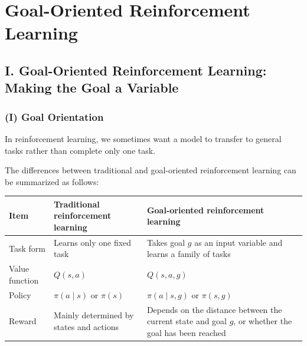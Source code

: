 \setcounter{section}{4}

\hypertarget{goal-oriented-reinforcement-learning}{%
\section{Goal-Oriented Reinforcement Learning}\label{goal-oriented-reinforcement-learning}}

\hypertarget{i.-goal-oriented-reinforcement-learning-making-the-goal-a-variable}{%
\subsection{I. Goal-Oriented Reinforcement Learning: Making the Goal a Variable}\label{i.-goal-oriented-reinforcement-learning-making-the-goal-a-variable}}

\hypertarget{i-goal-orientation}{%
\subsubsection{(I) Goal Orientation}\label{i-goal-orientation}}

In reinforcement learning, we sometimes want a model to transfer to general tasks rather than complete only one task.

The differences between traditional and goal-oriented reinforcement learning can be summarized as follows:

\begin{longtable}[]{@{}
  >{\raggedright\arraybackslash}p{}
  >{\raggedright\arraybackslash}p{}
  >{\raggedright\arraybackslash}p{}@{}}
\toprule
Item & Traditional reinforcement learning & Goal-oriented reinforcement learning \\
\midrule
\endhead
Task form & Learns only one fixed task & Takes goal \(g\) as an input variable and learns a family of tasks \\
Value function & \(Q(s,a)\) & \(Q(s,a,g)\) \\
Policy & \(\pi(a\mid s)\) or \(\pi(s)\) & \(\pi(a\mid s,g)\) or \(\pi(s,g)\) \\
Reward & Mainly determined by states and actions & Depends on the distance between the current state and goal \(g\), or whether the goal has been reached \\
\bottomrule
\end{longtable}

